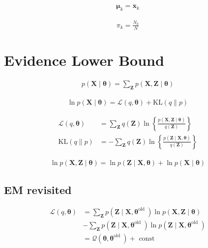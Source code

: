 \documentclass{article}
\begin{document}
\begin{align*}
\boldsymbol{\mu}_{k}=\overline{\mathbf{x}}_{k} 
\tag{15.49}
\end{align*}

\begin{align*}
\pi_{k}=\frac{N_{k}}{N} 
\tag{15.50}
\end{align*}

\section{Evidence Lower Bound}

\begin{align*}
p(\mathbf{X} \mid \boldsymbol{\theta})=\sum_{\mathbf{Z}} p(\mathbf{X}, \mathbf{Z} \mid \boldsymbol{\theta}) 
\tag{15.51}
\end{align*}

\begin{align*}
\ln p(\mathbf{X} \mid \boldsymbol{\theta})=\mathcal{L}(q, \boldsymbol{\theta})+\mathrm{KL}(q \| p) 
\tag{15.52}
\end{align*}

\begin{align*}
\mathcal{L}(q, \boldsymbol{\theta}) & =\sum_{\mathbf{Z}} q(\mathbf{Z}) \ln \left\{\frac{p(\mathbf{X}, \mathbf{Z} \mid \boldsymbol{\theta})}{q(\mathbf{Z})}\right\}  
\tag{15.53}\\
\mathrm{KL}(q \| p) & =-\sum_{\mathbf{Z}} q(\mathbf{Z}) \ln \left\{\frac{p(\mathbf{Z} \mid \mathbf{X}, \boldsymbol{\theta})}{q(\mathbf{Z})}\right\}
\tag{15.54}
\end{align*}

\begin{align*}
\ln p(\mathbf{X}, \mathbf{Z} \mid \boldsymbol{\theta})=\ln p(\mathbf{Z} \mid \mathbf{X}, \boldsymbol{\theta})+\ln p(\mathbf{X} \mid \boldsymbol{\theta})
\tag{15.55}
\end{align*}

\subsection{EM revisited}

\begin{align*}
\mathcal{L}(q, \boldsymbol{\theta}) & =\sum_{\mathbf{Z}} p\left(\mathbf{Z} \mid \mathbf{X}, \boldsymbol{\theta}^{\text{old }}\right) \ln p(\mathbf{X}, \mathbf{Z} \mid \boldsymbol{\theta})\\
& -\sum_{\mathbf{Z}} p\left(\mathbf{Z} \mid \mathbf{X}, \boldsymbol{\theta}^{\text{old }}\right) \ln p\left(\mathbf{Z} \mid \mathbf{X}, \boldsymbol{\theta}^{\text{old }}\right) \\
& =\mathcal{Q}\left(\boldsymbol{\theta}, \boldsymbol{\theta}^{\text{old }}\right)+\text{ const }
\tag{15.56}
\end{align*}
\end{document}
